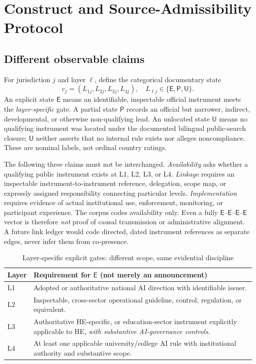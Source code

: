 \documentclass[conference,letterpaper]{IEEEtran}
\newcommand{\stE}{\textsf{E}}
\newcommand{\stP}{\textsf{P}}
\newcommand{\stU}{\textsf{U}}
\begin{document}
\section{Construct and Source-Admissibility Protocol}
\subsection{Different observable claims}
For jurisdiction $j$ and layer $\ell$, define the categorical documentary state
\begin{equation}\label{eq:chain}
 c_j=(L_{1j},L_{2j},L_{3j},L_{4j}),\quad L_{\ell j}\in\{\stE,\stP,\stU\}.
\end{equation}
An explicit state $\stE$ means an identifiable, inspectable official instrument meets the \emph{layer-specific} gate. A partial state $\stP$ records an official but narrower, indirect, developmental, or otherwise non-qualifying lead. An unlocated state $\stU$ means no qualifying instrument was located under the documented bilingual public-search closure; $\stU$ neither asserts that no internal rule exists nor alleges noncompliance. These are nominal labels, not ordinal country ratings.

The following three claims must not be interchanged. \emph{Availability} asks whether a qualifying public instrument exists at L1, L2, L3, or L4. \emph{Linkage} requires an inspectable instrument-to-instrument reference, delegation, scope map, or expressly assigned responsibility connecting particular levels. \emph{Implementation} requires evidence of actual institutional use, enforcement, monitoring, or participant experience. The corpus codes availability only. Even a fully $\stE$--$\stE$--$\stE$--$\stE$ vector is therefore \emph{not} proof of causal transmission or administrative alignment. A future link ledger would code directed, dated instrument references as separate edges, never infer them from co-presence.

\begin{table}[t]
\centering\caption{Layer-specific explicit gates: different scope, same evidential discipline}\label{tab:gates}
\footnotesize
\begin{tabularx}{\columnwidth}{@{}p{}X@{}}
\toprule
Layer & Requirement for $\stE$ (not merely an announcement)\tabularnewline\midrule
L1 & Adopted or authoritative national AI direction with identifiable issuer.\tabularnewline
L2 & Inspectable, cross-sector operational guideline, control, regulation, or equivalent.\tabularnewline
L3 & Authoritative HE-specific, or education-sector instrument explicitly applicable to HE, \emph{with substantive AI-governance controls}.\tabularnewline
L4 & At least one applicable university/college AI rule with institutional authority and substantive scope.\tabularnewline
\bottomrule
\end{tabularx}
\end{table}
\end{document}
